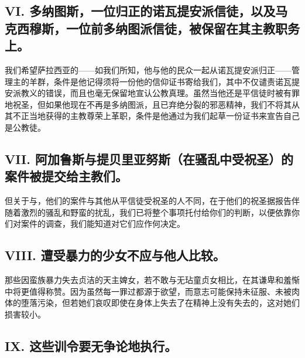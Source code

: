 
\subsection{VI. 多纳图斯，一位归正的诺瓦提安派信徒，以及马克西穆斯，一位前多纳图派信徒，被保留在其主教职务上。}

我们希望萨拉西亚的——如我们所知，他与他的民众一起从诺瓦提安派归正——管理主的羊群，条件是他记得须将一份他的信仰证书寄给我们，其中不仅谴责诺瓦提安派教义的错误，而且也毫无保留地宣认公教真理。虽然当他还是平信徒时被有罪地祝圣，但如果他现在不再是多纳图派，且已弃绝分裂的邪恶精神，我们不将其从其不正当地获得的主教尊荣上革职，条件是他通过为我们起草一份证书来宣告自己是公教徒。\par


\subsection{VII. 阿加鲁斯与提贝里亚努斯（在骚乱中受祝圣）的案件被提交给主教们。}

但关于与，他们的案件与其他从平信徒受祝圣的人不同，在于他们的祝圣据报告伴随着激烈的骚乱和野蛮的扰乱，我们已将整个事项托付给你们的判断，以便依靠你们对案件的调查，我们能知道对它们应作何决定。\par


\subsection{VIII. 遭受暴力的少女不应与他人比较。}

那些因蛮族暴力失去贞洁的天主婢女，若不敢与无玷童贞女相比，在其谦卑和羞惭中将更值得称赞。因为虽然每一罪过都源于欲望，而意志可能保持未征服、未被肉体的堕落污染，但若她们哀叹即使在身体上失去了在精神上没有失去的，这对她们损害较小。\par


\subsection{IX. 这些训令要无争论地执行。}

